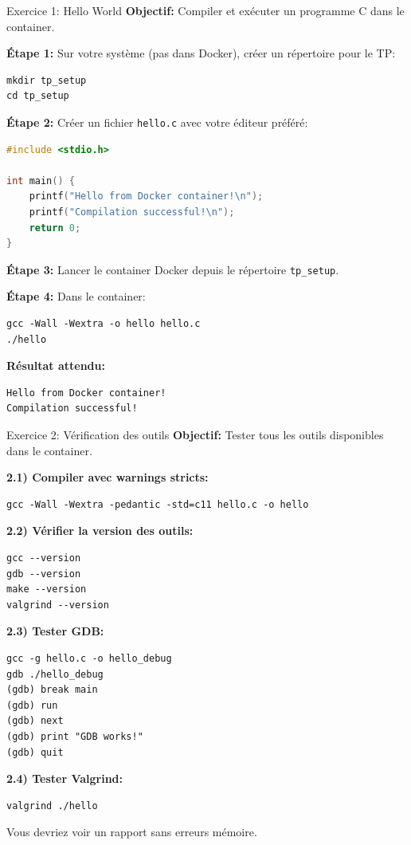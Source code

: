 \documentclass[10pt,a4paper]{article}
\begin{document}
\begin{exercicebox}{Exercice 1: Hello World}
\textbf{Objectif:} Compiler et exécuter un programme C dans le container.

\textbf{Étape 1:} Sur votre système (pas dans Docker), créer un répertoire pour le TP:
\begin{verbatim}
mkdir tp_setup
cd tp_setup
\end{verbatim}

\textbf{Étape 2:} Créer un fichier \texttt{hello.c} avec votre éditeur préféré:
\begin{lstlisting}[language=C]
#include <stdio.h>

int main() {
    printf("Hello from Docker container!\n");
    printf("Compilation successful!\n");
    return 0;
}
\end{lstlisting}

\textbf{Étape 3:} Lancer le container Docker depuis le répertoire \texttt{tp\_setup}.

\textbf{Étape 4:} Dans le container:
\begin{verbatim}
gcc -Wall -Wextra -o hello hello.c
./hello
\end{verbatim}

\textbf{Résultat attendu:}
\begin{verbatim}
Hello from Docker container!
Compilation successful!
\end{verbatim}
\end{exercicebox}

\begin{exercicebox}{Exercice 2: Vérification des outils}
\textbf{Objectif:} Tester tous les outils disponibles dans le container.

\textbf{2.1) Compiler avec warnings stricts:}
\begin{verbatim}
gcc -Wall -Wextra -pedantic -std=c11 hello.c -o hello
\end{verbatim}

\textbf{2.2) Vérifier la version des outils:}
\begin{verbatim}
gcc --version
gdb --version
make --version
valgrind --version
\end{verbatim}

\textbf{2.3) Tester GDB:}
\begin{verbatim}
gcc -g hello.c -o hello_debug
gdb ./hello_debug
(gdb) break main
(gdb) run
(gdb) next
(gdb) print "GDB works!"
(gdb) quit
\end{verbatim}

\textbf{2.4) Tester Valgrind:}
\begin{verbatim}
valgrind ./hello
\end{verbatim}

Vous devriez voir un rapport sans erreurs mémoire.
\end{exercicebox}
\end{document}

